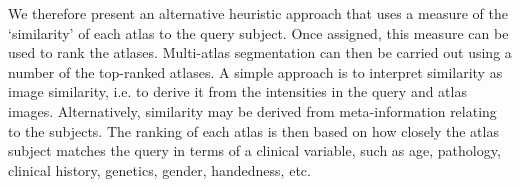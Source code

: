 We therefore present an alternative heuristic approach that uses a
measure of the ‘similarity’ of each atlas to the query subject. Once
assigned, this measure can be used to rank the atlases. Multi-atlas
segmentation can then be carried out using a number of the top-ranked
atlases. A simple approach is to interpret similarity as image similarity,
i.e. to derive it from the intensities in the query and atlas images.
Alternatively, similarity may be derived from meta-information relating
to the subjects. The ranking of each atlas is then based on how closely
the atlas subject matches the query in terms of a clinical variable, such
as age, pathology, clinical history, genetics, gender, handedness, etc.

